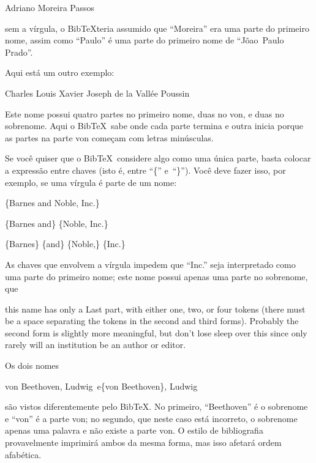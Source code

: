 \documentclass[article,openany]{memoir}
\newenvironment{exemplo}{\begin{center}}{\end{center}}
\begin{document}
\begin{exemplo}
Adriano Moreira Passos
\end{exemplo}

sem a vírgula, o Bib\TeX teria assumido que ``Moreira'' era uma parte
do primeiro nome, assim como ``Paulo'' é uma parte do primeiro nome de
``Jõao~Paulo Prado''.

Aqui está um outro exemplo:

\begin{exemplo}
Charles Louis Xavier Joseph de la Vallée Poussin
\end{exemplo}

Este nome possui quatro partes no primeiro nome, duas no von, e duas
no sobrenome. Aqui o Bib\TeX\ sabe onde cada parte termina e outra
inicia porque as partes na parte von começam com letras minúsculas.

Se você quiser que o Bib\TeX\ considere algo como uma única parte,
basta colocar a expressão entre chaves (isto é, entre ``\{''
e~``\}''). Você deve fazer isso, por exemplo, se uma vírgula é parte
de um nome:

\begin{exemplo}
\begin{minipage}{5cm}
\{Barnes and Noble, Inc.\}

\{Barnes and\} \{Noble, Inc.\}

\{Barnes\} \{and\} \{Noble,\} \{Inc.\}
\end{minipage}
\end{exemplo}

As chaves que envolvem a vírgula impedem que ``Inc.'' seja
interpretado como uma parte do primeiro nome; este nome possui apenas
uma parte no sobrenome, que

 this name has only a Last part, with either one, two, or four tokens
 (there must be a space separating the tokens in the second and third
 forms). Probably the second form is slightly more meaningful, but
 don't lose sleep over this since only rarely will an institution be
 an author or editor.

Os dois nomes
\begin{exemplo}
von Beethoven, Ludwig\quad\ e\quad \{von Beethoven\}, Ludwig
\end{exemplo}
são vistos diferentemente pelo Bib\TeX. No primeiro, ``Beethoven'' é o
sobrenome e ``von'' é a parte von; no segundo, que neste caso está
incorreto, o sobrenome apenas uma palavra e não existe a parte von. O
estilo de bibliografia provavelmente imprimirá ambos da mesma forma,
mas isso afetará ordem afabética.
\end{document}
